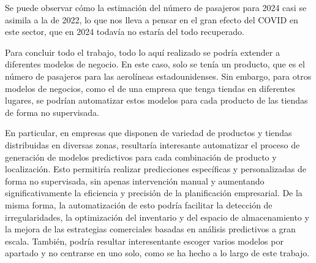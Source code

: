 \documentclass[12pt,twoside]{article}
\begin{document}
Se puede observar cómo la estimación del número de pasajeros para 2024 casi se asimila a la de 2022, lo que nos lleva a pensar en el gran efecto del COVID en este sector, que en 2024 todavía no estaría del todo recuperado.

Para concluir todo el trabajo, todo lo aquí realizado se podría extender a diferentes modelos de negocio. En este caso, solo se tenía un producto, que es el número de pasajeros para las aerolíneas estadounidenses. Sin embargo, para otros modelos de negocios, como el de una empresa que tenga tiendas en diferentes lugares, se podrían automatizar estos modelos para cada producto de las tiendas de forma no supervisada.

En particular, en empresas que disponen de variedad de productos y tiendas distribuidas en diversas zonas, resultaría interesante automatizar el proceso de generación de modelos predictivos para cada combinación de producto y localización. Esto permitiría realizar predicciones específicas y personalizadas de forma no supervisada, sin apenas intervención manual y aumentando significativamente la eficiencia y precisión de la planificación empresarial. De la misma forma, la automatización de esto podría facilitar la detección de irregularidades, la optimización del inventario y del espacio de almacenamiento y la mejora de las estrategias comerciales basadas en análisis predictivos a gran escala. También, podría resultar interesentante escoger varios modelos por apartado y no centrarse en uno solo, como se ha hecho a lo largo de este trabajo.

\newpage
\end{document}
